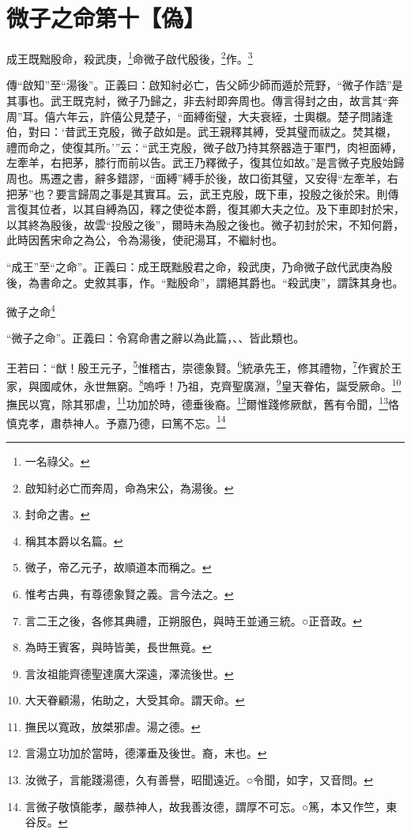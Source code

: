 \section{微子之命第十【偽】}


成王既黜殷命，殺武庚，\footnote{一名祿父。}命微子啟代殷後，\footnote{啟知紂必亡而奔周，命為宋公，為湯後。}作。\footnote{封命之書。}


{\noindent\zhuan{}\fzbyks 傳“啟知”至“湯後”。正義曰：啟知紂必亡，告父師少師而遁於荒野，“微子作誥”是其事也。武王既克紂，微子乃歸之，非去紂即奔周也。傳言得封之由，故言其“奔周”耳。僖六年云，許僖公見楚子，“面縛銜璧，大夫衰絰，士輿櫬。楚子問諸逢伯，對曰：‘昔武王克殷，微子啟如是。武王親釋其縛，受其璧而祓之。焚其櫬，禮而命之，使復其所。’”云：“武王克殷，微子啟乃持其祭器造于軍門，肉袒面縛，左牽羊，右把茅，膝行而前以告。武王乃釋微子，復其位如故。”是言微子克殷始歸周也。馬遷之書，辭多錯謬，“面縛”縛手於後，故口銜其璧，又安得“左牽羊，右把茅”也？要言歸周之事是其實耳。云，武王克殷，既下車，投殷之後於宋。則傳言復其位者，以其自縛為囚，釋之使從本爵，復其卿大夫之位。及下車即封於宋，以其終為殷後，故雲“投殷之後”，爾時未為殷之後也。微子初封於宋，不知何爵，此時因舊宋命之為公，令為湯後，使祀湯耳，不繼紂也。 \par}

{\noindent\shu{}\fzkt “成王”至“之命”。正義曰：成王既黜殷君之命，殺武庚，乃命微子啟代武庚為殷後，為書命之。史敘其事，作。“黜殷命”，謂絕其爵也。“殺武庚”，謂誅其身也。 \par}

微子之命\footnote{稱其本爵以名篇。}

{\noindent\shu{}\fzkt “微子之命”。正義曰：令寫命書之辭以為此篇，、、皆此類也。 \par}

王若曰：“猷！殷王元子，\footnote{微子，帝乙元子，故順道本而稱之。}惟稽古，崇德象賢。\footnote{惟考古典，有尊德象賢之義。言今法之。}統承先王，修其禮物，\footnote{言二王之後，各修其典禮，正朔服色，與時王並通三統。○正音政。}作賓於王家，與國咸休，永世無窮。\footnote{為時王賓客，與時皆美，長世無竟。}嗚呼！乃祖，克齊聖廣淵，\footnote{言汝祖能齊德聖達廣大深遠，澤流後世。}皇天眷佑，誕受厥命。\footnote{大天眷顧湯，佑助之，大受其命。謂天命。}撫民以寬，除其邪虐，\footnote{撫民以寬政，放桀邪虐。湯之德。}功加於時，德垂後裔。\footnote{言湯立功加於當時，德澤垂及後世。裔，末也。}爾惟踐修厥猷，舊有令聞，\footnote{汝微子，言能踐湯德，久有善譽，昭聞遠近。○令聞，如字，又音問。}恪慎克孝，肅恭神人。予嘉乃德，曰篤不忘。\footnote{言微子敬慎能孝，嚴恭神人，故我善汝德，謂厚不可忘。○篤，本又作竺，東谷反。}



